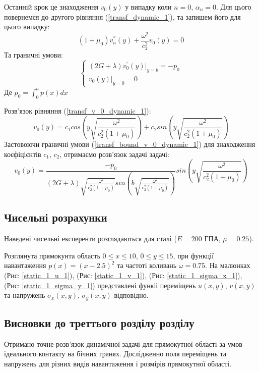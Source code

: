 Останній крок це знаходження $v_0(y)$ у випадку коли $n=0$, $\alpha_n =0$.
Для цього повернемся до другого рівняння (\ref{transf_dynamic_1}), та запишем його для цього випадку:
\begin{equation}\label{transf_v_0_dynamic_1}
    (1 + \mu_0) v_n^{''}(y) + \frac{\omega^2}{c_2^2}v_0(y) = 0
\end{equation}
Та граничні умови:
\begin{equation}\label{transf_bound_v_0_dynamic_1}
    \begin{cases}
        (2G + \lambda)v_0^{'}(y)|_{y=b} = -p_0 \\
        v_0(y)|_{y=0} = 0
    \end{cases}
\end{equation}
Де $p_0 = \int_{0}^{a}p(x)dx$

Розв'язок рівняння (\ref{transf_v_0_dynamic_1}):
\begin{equation}
    v_0(y) = c_1 cos \left(y \sqrt{\frac{\omega^2}{c_2^2(1 + \mu_0)}} \right) + c_2 sin \left( y \sqrt{\frac{\omega^2}{c_2^2(1 + \mu_0)}} \right)
\end{equation}
Застовоючи граничні умови (\ref{transf_bound_v_0_dynamic_1}) для знаходження коєфіцієнтів $c_1$, $c_2$, отримаємо розв'язок задачі задачі:
\begin{equation}
    v_0(y) = \frac{-p_0}{(2G + \lambda) \sqrt{\frac{\omega^2}{c_2^2(1 + \mu_0)}} sin \left(b \sqrt{\frac{\omega^2}{c_2^2(1 + \mu_0)}} \right) } sin \left(y \sqrt{\frac{\omega^2}{c_2^2(1 + \mu_0)}} \right)
\end{equation}

\subsection{Чисельні розрахунки}
Наведені чисельні експеренти розглядаються для сталі ($E=200$ ГПА, $\mu=0.25$).

Розглянута прямокунта область $0 \le x \le 10$, $0 \le y \le 15$, при функції навантаження $p(x)=(x-2.5)^2$ та частоті коливань $\omega=0.75$.
На малюнках (Рис: \ref{static_1_u_1}), (Рис: \ref{static_1_v_1}), (Рис: \ref{static_1_sigma_x_1}), (Рис: \ref{static_1_sigma_y_1})
представлені функіі переміщень $u(x,y)$, $v(x,y)$ та напружень $\sigma_x(x,y)$, $\sigma_y(x,y)$ відповідно.

\subsection{Висновки до треттього розділу розділу}
Отримано точне розв'язок динамічної задачі для прямокутної області за умов ідеального контакту на бічних гранях.
Дослідженно поля переміщень та напружень для різних видів навантаження і розмірів прямокутної області.